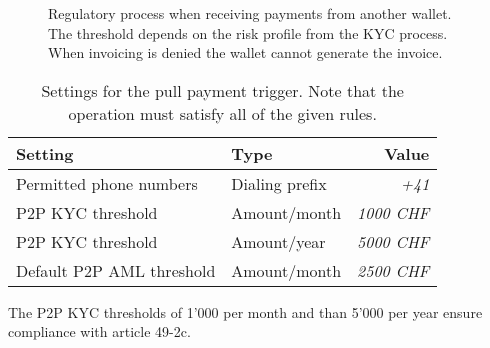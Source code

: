 \begin{figure}[h!]
\begin{center}
  \end{center}
  \caption{Regulatory process when receiving payments from another wallet.
    The threshold depends on the risk profile from the KYC process.
    When invoicing is denied the wallet cannot generate the invoice.}
\end{figure}


\begin{table}[h!]
  \caption{Settings for the pull payment trigger. Note that the operation
  must satisfy all of the given rules.}
  \begin{tabular}{l|l|r}
    {\bf Setting}             & {\bf Type}      & {\bf Value} \\ \hline \hline
    Permitted phone numbers   & Dialing prefix  & {\em +41} \\
    P2P KYC threshold         & Amount/month    & {\em  1000 CHF} \\
    P2P KYC threshold         & Amount/year     & {\em  5000 CHF} \\
    Default P2P AML threshold & Amount/month    & {\em  2500 CHF} \\
  \end{tabular}
\end{table}

The P2P KYC thresholds of 1'000 \CURRENCY{} per month and than 5'000
\CURRENCY{} per year ensure compliance with article 49-2c.
